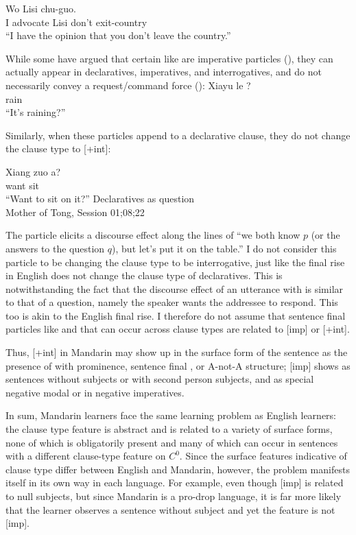 \gll Wo  Lisi  chu-guo.\\
I advocate Lisi don't exit-country\\
\trans ``I have the opinion that you don't leave the country.'' \hfill \textcite[p.458]{lithompson}
\eex

While some have argued that certain  like  are imperative particles (\cite{zhudexi,chao1968,lithompson}), they can actually appear in declaratives, imperatives, and interrogatives, and do not necessarily convey a request/command force (\cite{hanyang1995,liboya2006,ettingermalamud2014,YY2021}):
Xiayu le ?\\
rain \Asp{} \Sfp{}\\
\trans ``It's raining?''
\eex

Similarly, when these particles append to a declarative clause, they do not change the clause type to [+int]:

\gll %
Xiang zuo a?\\
want sit \Sfp{}\\
``Want to sit on it?''
\hfill Declaratives as question\\
Mother of Tong, Session 01;08;22
\eex

The particle  elicits a discourse effect along the lines of ``we both know $p$ (or the answers to the question $q$), but let's put it on the table.'' I do not consider this particle to be changing the clause type to be interrogative, just like the final rise in English does not change the clause type of declaratives. This is notwithstanding the fact that the discourse effect of an utterance with  is similar to that of a question, namely the speaker wants the addressee to respond. This too is akin to the English final rise.
I therefore do not assume that sentence final particles like  and  that can occur across clause types are related to [imp] or [+int].

Thus, [+int] in Mandarin may show up in the surface form of the sentence as the presence of \twh{} with prominence, sentence final , or A-not-A structure; [imp] shows as sentences without subjects or with second person subjects, and as special negative modal  or  in negative imperatives. 

In sum, Mandarin learners face the same learning problem as English learners: the clause type feature is abstract and is related to a variety of surface forms, none of which is obligatorily present and many of which can occur in sentences with a different clause-type feature on $C^{0}$. Since the surface features indicative of clause type differ between English and Mandarin, however, the problem manifests itself in its own way in each language. For example, even though [imp] is related to null subjects, but since Mandarin is a pro-drop language, it is far more likely that the learner observes a sentence without subject and yet the feature is not [imp].  

